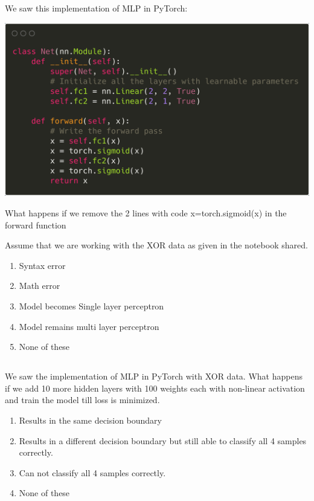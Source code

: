 \begin{frame}
\section{}
We saw this implementation of MLP in PyTorch:

\includegraphics[scale=0.1]{images/q31_2.png}

What happens if we remove the 2 lines with code x=torch.sigmoid(x) in the forward function

Assume that we are working with the XOR data as given in the notebook shared.

\begin{enumerate}[label=(\Alph*)]
\item Syntax error
\item Math error
\item Model becomes Single layer perceptron   %
\item Model remains multi layer perceptron
\item None of these    %
\end{enumerate}
\end{frame}


\begin{frame}
\section{}
We saw the implementation of MLP in PyTorch with XOR data. What happens if we add 10 more hidden layers with 100 weights each with non-linear activation and train the model till loss is minimized.
\begin{enumerate}[label=(\Alph*)]
\item Results in the same decision boundary
\item Results in a different decision boundary but still able to classify all 4 samples correctly.    %
\item Can not classify all 4 samples correctly.
\item None of these  %
\end{enumerate}
\end{frame}




